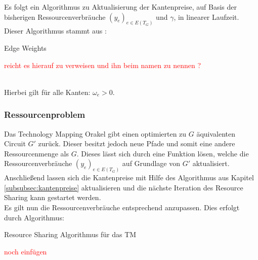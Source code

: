 \documentclass[11pt, a4paper, german]{article}
\newcommand{\TM}{Technology  Mapping }
\begin{document}
Es folgt ein Algorithmus zu Aktualisierung der Kantenpreise, auf Basis der bisherigen Ressourcenverbräuche $(y_e)_{e\in E(T_G)}$ und $\gamma$, in linearer Laufzeit. Dieser Algorithmus stammt aus \cite{Daboul2018}:\\
\LinesNumbered
\begin{algorithm}[H]
\DontPrintSemicolon
\caption{Edge Weights}
\textcolor{red}{reicht es hierauf zu verweisen und ihn beim namen zu nennen ? }
\end{algorithm}\ \\

Hierbei gilt für alle Kanten: $\omega_e > 0$. 

\subsubsection{Ressourcenproblem}
Das \TM Orakel  gibt einen optimierten zu $G$ äquivalenten Circuit $G'$ zurück. Dieser besitzt jedoch neue Pfade und somit eine andere Ressourcenmenge als $G$. 
Dieses lässt sich durch eine Funktion lösen, welche die Ressourcenverbräuche $(y_e)_{e\in E(T_G)}$ auf Grundlage von $G'$ aktualisiert. Anschließend lassen sich die Kantenpreise mit Hilfe des Algorithmus aus Kapitel \ref{subsubsec:kantenpreise} aktualisieren und die nächste Iteration des Resource Sharing kann gestartet werden. \\
Es gilt nun die Ressourcenverbräuche entsprechend anzupassen. Dies erfolgt durch Algorithmus: 

\LinesNumbered
\begin{algorithm}[H]
\DontPrintSemicolon
\caption{Resource Sharing Algorithmus für das TM}
\textcolor{red}{noch einfügen}
\end{algorithm}\ \\
\end{document}
